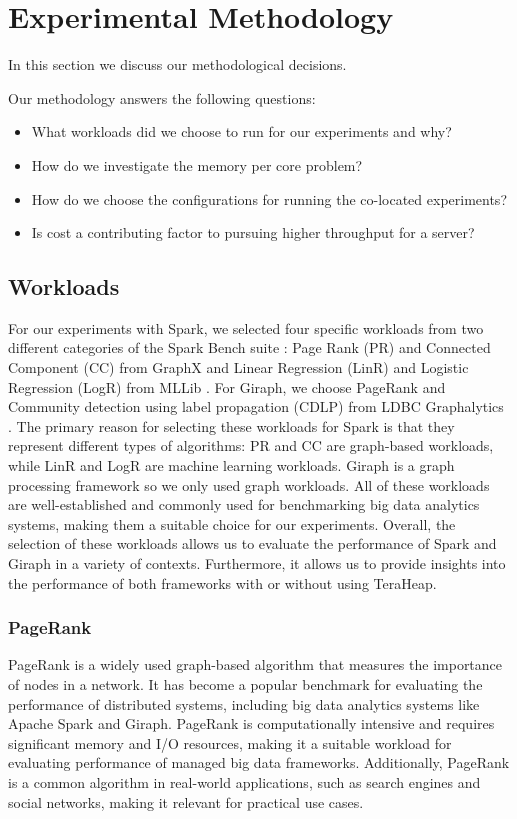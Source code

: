\section{Experimental Methodology}
\label{sec:method}

In this section we discuss our methodological decisions.

Our methodology answers the following questions:
\begin{itemize}
	\item{What workloads did we choose to run for our experiments and why?}
	\item{How do we investigate the memory per core problem?}
	\item{How do we choose the configurations for running the co-located experiments?}
	\item{Is cost a contributing factor to pursuing higher throughput for a server?}
\end{itemize}

\subsection{Workloads}
For our experiments with Spark, we selected four specific workloads from two
different categories of the Spark Bench suite \cite{Spark-Bench}: Page Rank (PR) and Connected
Component (CC) from GraphX \cite{GraphX} and Linear Regression (LinR) and Logistic Regression (LogR)
from MLLib \cite{MLLib}. For Giraph, we choose PageRank and Community detection 
using label propagation (CDLP) from LDBC Graphalytics \cite{ldbc}. The primary reason for selecting these workloads for Spark is that
they represent different types of algorithms: PR and CC are graph-based workloads, while LinR and LogR are machine learning
workloads. Giraph is a graph processing framework so we only used graph workloads. All of these
workloads are well-established and commonly used for benchmarking big
data analytics systems, making them a suitable choice for our
experiments. Overall, the selection of these workloads allows us to
evaluate the performance of Spark and Giraph in a variety of contexts. Furthermore, it allows us to
provide insights into the performance of both frameworks with or without using TeraHeap.


\subsubsection{PageRank}
PageRank is a widely used graph-based algorithm that measures the
importance of nodes in a network. It has become a popular benchmark
for evaluating the performance of distributed systems, including big
data analytics systems like Apache Spark and Giraph. PageRank is computationally
intensive and requires significant memory and I/O resources, making it
a suitable workload for evaluating performance of managed big data frameworks. Additionally, PageRank is a
common algorithm in real-world applications, such as search engines
and social networks, making it relevant for practical use cases.

